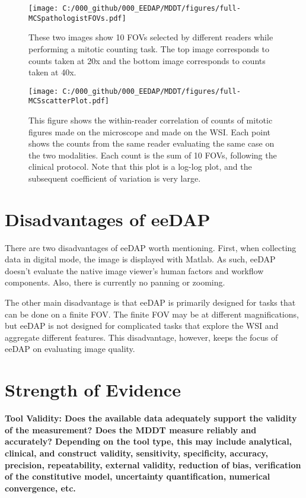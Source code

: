 \documentclass{article}%
\begin{document}
\begin{figure}[ptbh]
\label{fig_full-MCSpathologistFOVs}
\texttt{[image: C:/000\_github/000\_EEDAP/MDDT/figures/full-MCSpathologistFOVs.pdf]}
\caption{These two images show 10 FOVs selected by different readers while
performing a mitotic counting task. The top image corresponds to counts taken
at 20x and the bottom image corresponds to counts taken at 40x.}%
\end{figure}

\begin{figure}[ptbh]
\label{fig_full-MCSscatterPlot}
\texttt{[image: C:/000\_github/000\_EEDAP/MDDT/figures/full-MCSscatterPlot.pdf]}
\caption{This figure shows the within-reader correlation of counts of mitotic
figures made on the microscope and made on the WSI. Each point shows the
counts from the same reader evaluating the same case on the two modalities.
Each count is the sum of 10 FOVs, following the clinical protocol. Note that
this plot is a log-log plot, and the subsequent coefficient of variation is
very large.}%
\end{figure}

\section{Disadvantages of eeDAP}

\label{disadvantages-of-eedap}

There are two disadvantages of eeDAP worth mentioning. First, when collecting
data in digital mode, the image is displayed with Matlab. As such, eeDAP
doesn't evaluate the native image viewer's human factors and workflow
components. Also, there is currently no panning or zooming.

The other main disadvantage is that eeDAP is primarily designed for tasks that
can be done on a finite FOV. The finite FOV may be at different
magnifications, but eeDAP is not designed for complicated tasks that explore
the WSI and aggregate different features. This disadvantage, however, keeps
the focus of eeDAP on evaluating image quality.

\section{Strength of Evidence}

\label{strength-of-evidence}

\textbf{Tool Validity: Does the available data adequately support the validity
of the measurement? Does the MDDT measure reliably and accurately? Depending
on the tool type, this may include analytical, clinical, and construct
validity, sensitivity, specificity, accuracy, precision, repeatability,
external validity, reduction of bias, verification of the constitutive model,
uncertainty quantification, numerical convergence, etc.}
\end{document}
